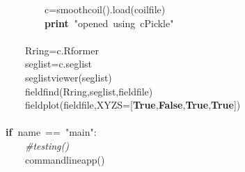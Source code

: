 \documentclass{article}
\newcommand{\hlstd}[1]{\textcolor[rgb]{0,0,0}{#1}}
\newcommand{\hlstr}[1]{\textcolor[rgb]{1,0,0}{#1}}
\newcommand{\hlslc}[1]{\textcolor[rgb]{0.51,0.51,0.51}{\it{#1}}}
\newcommand{\hlsym}[1]{\textcolor[rgb]{0,0,0}{#1}}
\newcommand{\hlkwa}[1]{\textcolor[rgb]{0,0,0}{\bf{#1}}}
\newcommand{\hlkwd}[1]{\textcolor[rgb]{0,0,0.51}{#1}}
\begin{document}
\hlstd{}\hlstd{\ \ \ \ \ \ \ \ }\hlstd{c}\hlsym{=}\hlstd{}\hlkwd{smoothcoil}\hlstd{}\hlsym{().}\hlstd{}\hlkwd{load}\hlstd{}\hlsym{(}\hlstd{coilfile}\hlsym{)}\hspace*{\fill}\\
\hlstd{}\hlstd{\ \ \ \ \ \ \ \ }\hlstd{}\hlkwa{print\ }\hlstd{}\hlstr{"opened\ using\ cPickle"}\hlstd{\hspace*{\fill}\\
}\hlstd{\ \ \ \ \ \ }\hlstd{\hspace*{\fill}\\
}\hlstd{\ \ \ \ }\hlstd{Rring}\hlsym{=}\hlstd{c}\hlsym{.}\hlstd{Rformer\hspace*{\fill}\\
}\hlstd{\ \ \ \ }\hlstd{seglist}\hlsym{=}\hlstd{c}\hlsym{.}\hlstd{seglist\hspace*{\fill}\\
}\hlstd{\ \ \ \ }\hlstd{}\hlkwd{seglistviewer}\hlstd{}\hlsym{(}\hlstd{seglist}\hlsym{)}\hspace*{\fill}\\
\hlstd{}\hlstd{\ \ \ \ }\hlstd{}\hlkwd{fieldfind}\hlstd{}\hlsym{(}\hlstd{Rring}\hlsym{,}\hlstd{seglist}\hlsym{,}\hlstd{fieldfile}\hlsym{)}\hspace*{\fill}\\
\hlstd{}\hlstd{\ \ \ \ }\hlstd{}\hlkwd{fieldplot}\hlstd{}\hlsym{(}\hlstd{fieldfile}\hlsym{,}\hlstd{XYZS}\hlsym{={[}}\hlstd{}\hlkwa{True}\hlstd{}\hlsym{,}\hlstd{}\hlkwa{False}\hlstd{}\hlsym{,}\hlstd{}\hlkwa{True}\hlstd{}\hlsym{,}\hlstd{}\hlkwa{True}\hlstd{}\hlsym{{]})}\hspace*{\fill}\\
\hlstd{}\hspace*{\fill}\\
\hlkwa{if\ }\hlstd{\textunderscore \textunderscore name\textunderscore \textunderscore \ }\hlsym{==\ }\hlstd{}\hlstr{"\textunderscore \textunderscore main\textunderscore \textunderscore "}\hlstd{}\hlsym{:}\hspace*{\fill}\\
\hlstd{}\hlstd{\ \ \ \ }\hlstd{}\hlslc{\#testing()}\hspace*{\fill}\\
\hlstd{}\hlstd{\ \ \ \ }\hlstd{}\hlkwd{commandlineapp}\hlstd{}\hlsym{()}\hspace*{\fill}\\
\hlstd{}\hlstd{\ \ \ \ }\hlstd{}\hspace*{\fill}\\
\hspace*{\fill}\\
\hspace*{\fill}\\
\mbox{}
\normalfont
\end{document}
